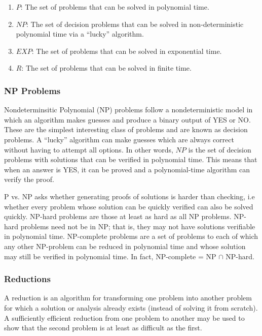 \documentclass{article}
\begin{document}
    \begin{enumerate}
        \item $P$:  The set of problems that can be solved in polynomial time.
        \item $NP$:  The set of decision problems that can be solved in non-deterministic polynomial time via a ``lucky'' algorithm.
        \item $EXP$: The set of problems that can be solved in exponential time. 
        \item $R$: The set of problems that can be solved in finite time.
    \end{enumerate}
    
    \subsubsection{NP Problems}
    Nondeterminsitic Polynomial (NP) problems follow a nondeterministic model in which an algorithm makes guesses and produce a binary output of YES or NO. These are the simplest interesting class of problems and are known as decision problems. A ``lucky” algorithm can make guesses which are always correct without having to attempt all options. In other words, $NP$ is the set of decision problems with solutions that can be verified in polynomial time. This means that when an answer is YES, it can be proved and a polynomial-time algorithm can verify the proof.
    
    P vs. NP asks whether generating proofs of solutions is harder than checking, i.e whether every problem whose solution can be quickly verified can also be solved quickly. NP-hard problems are those at least as hard as all NP problems. NP-hard problems need not be in NP; that is, they may not have solutions verifiable in polynomial time. NP-complete problems are a set of problems to each of which any other NP-problem can be reduced in polynomial time and whose solution may still be verified in polynomial time. In fact, NP-complete = NP $\cap$ NP-hard.
    
    \subsubsection{Reductions}
    A reduction is an algorithm for transforming one problem into another problem for which a solution or analysis already exists (instead of solving it from scratch). A sufficiently efficient reduction from one problem to another may be used to show that the second problem is at least as difficult as the first. 
    
\end{document}
